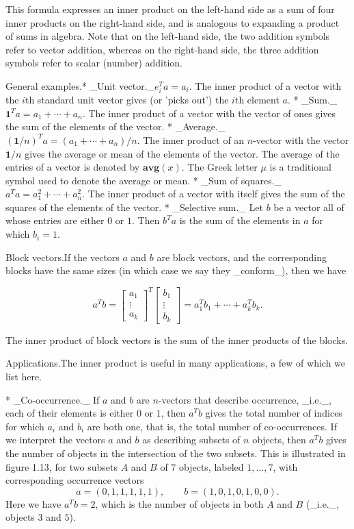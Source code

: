 This formula expresses an inner product on the left-hand side as a sum of four inner products on the right-hand side, and is analogous to expanding a product of sums in algebra. Note that on the left-hand side, the two addition symbols refer to vector addition, whereas on the right-hand side, the three addition symbols refer to scalar (number) addition.

General examples.* _Unit vector._\(e_{i}^{T}a=a_{i}\). The inner product of a vector with the \(i\)th standard unit vector gives (or 'picks out') the \(i\)th element \(a\).
* _Sum._\(\mathbf{1}^{T}a=a_{1}+\cdots+a_{n}\). The inner product of a vector with the vector of ones gives the sum of the elements of the vector.
* _Average._\((\mathbf{1}/n)^{T}a=(a_{1}+\cdots+a_{n})/n\). The inner product of an \(n\)-vector with the vector \(\mathbf{1}/n\) gives the average or mean of the elements of the vector. The average of the entries of a vector is denoted by \(\mathbf{avg}(x)\). The Greek letter \(\mu\) is a traditional symbol used to denote the average or mean.
* _Sum of squares._\(a^{T}a=a_{1}^{2}+\cdots+a_{n}^{2}\). The inner product of a vector with itself gives the sum of the squares of the elements of the vector.
* _Selective sum._ Let \(b\) be a vector all of whose entries are either \(0\) or \(1\). Then \(b^{T}a\) is the sum of the elements in \(a\) for which \(b_{i}=1\).

Block vectors.If the vectors \(a\) and \(b\) are block vectors, and the corresponding blocks have the same sizes (in which case we say they _conform_), then we have

\[a^{T}b=\left[\begin{array}{c}a_{1}\\ \vdots\\ a_{k}\end{array}\right]^{T}\left[\begin{array}{c}b_{1}\\ \vdots\\ b_{k}\end{array}\right]=a_{1}^{T}b_{1}+\cdots+a_{k}^{T}b_{k}.\]

The inner product of block vectors is the sum of the inner products of the blocks.

Applications.The inner product is useful in many applications, a few of which we list here.

* _Co-occurrence._ If \(a\) and \(b\) are \(n\)-vectors that describe occurrence, _i.e._, each of their elements is either \(0\) or \(1\), then \(a^{T}b\) gives the total number of indices for which \(a_{i}\) and \(b_{i}\) are both one, that is, the total number of co-occurrences. If we interpret the vectors \(a\) and \(b\) as describing subsets of \(n\) objects, then \(a^{T}b\) gives the number of objects in the intersection of the two subsets. This is illustrated in figure 1.13, for two subsets \(A\) and \(B\) of \(7\) objects, labeled \(1,\ldots,7\), with corresponding occurrence vectors \[a=(0,1,1,1,1,1),\qquad b=(1,0,1,0,1,0,0).\] Here we have \(a^{T}b=2\), which is the number of objects in both \(A\) and \(B\) (_i.e._, objects \(3\) and \(5\)).

 